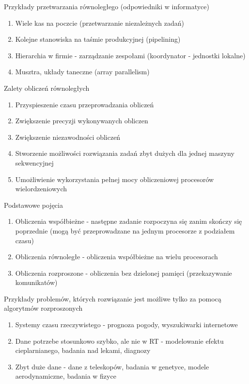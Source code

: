 \documentclass{beamer}
\begin{document}
\begin{frame}{Przykłady przetwarzania równoległego (odpowiedniki w informatyce)}
  \begin{enumerate}
  \item Wiele kas na poczcie (przetwarzanie niezależnych zadań)
  \item Kolejne stanowiska na taśmie produkcyjnej (pipelining)
  \item Hierarchia w firmie - zarządzanie zespołami (koordynator - jednostki lokalne)
  \item Musztra, układy taneczne (array parallelism)
  \end{enumerate}
\end{frame}

\begin{frame}{Zalety obliczeń równoległych}
  \begin{enumerate}
  \item Przyspieszenie czasu przeprowadzania obliczeń
  \item Zwiększenie precyzji wykonywanych obliczen
  \item Zwiększenie niezawodności obliczeń
  \item Stworzenie możliwości rozwiązania zadań zbyt dużych dla jednej maszyny sekwencyjnej
  \item Umożliwienie wykorzystania pełnej mocy obliczeniowej procesorów wielordzeniowych
  \end{enumerate}
\end{frame}

\begin{frame}{Podstawowe pojęcia}
  \begin{enumerate}
  \item Obliczenia współbieżne - następne zadanie rozpoczyna się zanim skończy się poprzednie (mogą być przeprowadzane na jednym procesorze z podziałem czasu)
  \item Obliczenia równoległe - obliczenia współbieżne na wielu procesorach
  \item Obliczenia rozproszone - obliczenia bez dzielonej pamięci (przekazywanie komunikatów)
  \end{enumerate}
\end{frame}

\begin{frame}{Przykłady problemów, których rozwiązanie jest możliwe tylko za pomocą algorytmów rozproszonych}
  \begin{enumerate}
  \item Systemy czasu rzeczywistego - prognoza pogody, wyszukiwarki internetowe
  \item Dane potrzebe stosunkowo szybko, ale nie w RT - modelowanie efektu cieplarnianego, badania nad lekami, diagnozy
  \item Zbyt duże dane - dane z teleskopów, badania w genetyce, modele aerodynamiczne, badania w fizyce
  \end{enumerate}
\end{frame}
\end{document}
